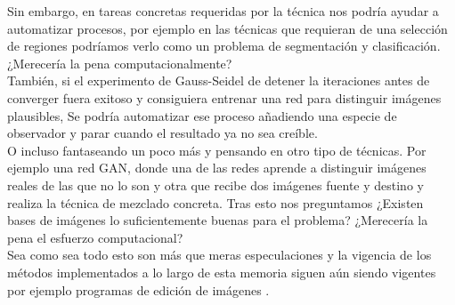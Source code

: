 \documentclass[11pt,twoside,titlepage,a4paper]{article}
\numberwithin{equation}{section} %
\theoremstyle{usual}
\begin{document}
Sin embargo, en tareas concretas requeridas por la técnica nos podría ayudar a automatizar procesos, por ejemplo en las técnicas que requieran de una selección de regiones podríamos verlo como un problema de segmentación y clasificación.  ¿Merecería la pena computacionalmente?
\\

También, si el experimento de Gauss-Seidel de detener la iteraciones antes de converger fuera exitoso y consiguiera entrenar una red para distinguir imágenes plausibles, Se podría  automatizar ese proceso añadiendo una especie de observador y parar cuando el resultado ya no sea creíble. 
\\

O incluso fantaseando un poco más  y pensando en otro tipo de técnicas.  Por ejemplo una red GAN, donde una de las redes aprende a distinguir imágenes reales de las que no lo son y otra que recibe dos imágenes fuente y destino y realiza la técnica de mezclado concreta. 
Tras esto nos preguntamos ¿Existen bases de imágenes lo suficientemente buenas para el problema? ¿Merecería la pena el esfuerzo computacional?  
\\

Sea como sea todo esto son más que meras especulaciones y la vigencia de los métodos implementados a lo largo de esta memoria siguen aún siendo vigentes por ejemplo programas de edición de imágenes \cite{poissonImageEditing}.

\newpage

\printbibliography
\end{document}
